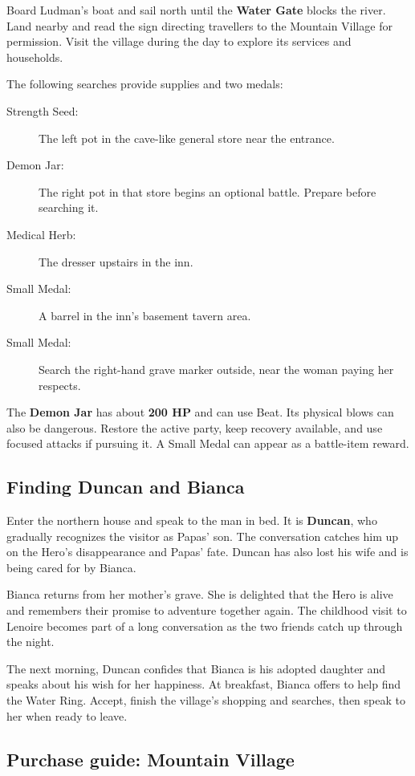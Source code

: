 Board Ludman's boat and sail north until the \textbf{Water Gate}
blocks the river. Land nearby and read the sign directing travellers
to the Mountain Village for permission. Visit the village during the
day to explore its services and households.

The following searches provide supplies and two medals:
\begin{description}
  \item[Strength Seed:] The left pot in the cave-like general store
    near the entrance.
  \item[Demon Jar:] The right pot in that store begins an optional
    battle. Prepare before searching it.
  \item[Medical Herb:] The dresser upstairs in the inn.
  \item[Small Medal:] A barrel in the inn's basement tavern area.
  \item[Small Medal:] Search the right-hand grave marker outside,
    near the woman paying her respects.
\end{description}

The \textbf{Demon Jar} has about \textbf{200 HP} and can use Beat.
Its physical blows can also be dangerous. Restore the active party,
keep recovery available, and use focused attacks if pursuing it.
A Small Medal can appear as a battle-item reward.

\subsection*{Finding Duncan and Bianca}

Enter the northern house and speak to the man in bed. It is
\textbf{Duncan}, who gradually recognizes the visitor as Papas' son.
The conversation catches him up on the Hero's disappearance and Papas'
fate. Duncan has also lost his wife and is being cared for by Bianca.

Bianca returns from her mother's grave. She is delighted that the Hero
is alive and remembers their promise to adventure together again.
The childhood visit to Lenoire becomes part of a long conversation
as the two friends catch up through the night.

The next morning, Duncan confides that Bianca is his adopted daughter
and speaks about his wish for her happiness. At breakfast, Bianca
offers to help find the Water Ring. Accept, finish the village's
shopping and searches, then speak to her when ready to leave.

\subsection*{Purchase guide: Mountain Village}

